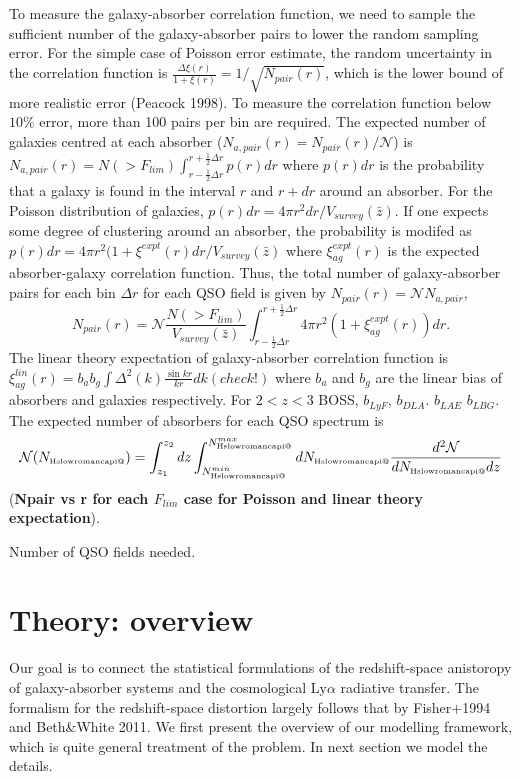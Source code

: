 \documentclass[useAMS,usenatbib,twocolumn]{mn2e}
\makeatletter
\newcommand{\Rmnum}[1]{\expandafter\@slowromancap\romannumeral #1@}
\newcommand{\LyA}{\mbox{Ly}\alpha}
\newcommand{\NHI}{N_{\mbox{\tiny H\Rmnum{1}}}}
\makeatother
\begin{document}
To measure the galaxy-absorber correlation function, we need to sample
the sufficient number of the galaxy-absorber pairs to lower the random
sampling error. For the simple case of Poisson error estimate, the random 
uncertainty in the correlation function is $\frac{\Delta \xi(r)}{1+\xi(r)}
=1/\sqrt{N_{pair}(r)}$, which is the lower bound of more realistic error 
(Peacock 1998). To measure the correlation function below $10\%$ error,
more than 100 pairs per bin are required. The expected number of galaxies 
centred at 
each absorber ($N_{a,pair}(r)=N_{pair}(r)/\mathcal{N}$) is $N_{a,pair}(r)=N(>F_{lim})
\int_{r-\frac{1}{2}\Delta r}^{r+\frac{1}{2}\Delta r}p(r)dr$ where $p(r)dr$ is the 
probability that a galaxy is found in the interval $r$ and $r+dr$ around an 
absorber. For the Poisson distribution of galaxies, 
$p(r)dr=4\pi r^2dr/V_{survey}(\bar{z})$. If one expects some degree of clustering
around an absorber, the probability is modifed as 
$p(r)dr=4\pi r^2(1+\xi^{expt}(r) dr/V_{survey}(\bar{z})$ where $\xi^{expt}_{ag}(r)$ 
is the expected absorber-galaxy correlation function.
Thus, the total number of galaxy-absorber pairs for each bin $\Delta r$ for
each QSO field is given by $N_{pair}(r)=\mathcal{N}N_{a,pair}$,
\begin{equation}
N_{pair}(r)=\mathcal{N}\frac{N(>F_{lim})}{V_{survey}(\bar{z})}
\int_{r-\frac{1}{2}\Delta r}^{r+\frac{1}{2}\Delta r}
4\pi r^2\left(1+\xi^{expt}_{ag}(r)\right)dr.
\end{equation}
The linear theory expectation of galaxy-absorber correlation function is 
$\xi_{ag}^{lin}(r)=b_ab_g\int \Delta^2(k)\frac{\sin kr}{kr}dk (check!)$
where $b_a$ and $b_g$ are the linear bias of absorbers and galaxies 
respectively. For $2<z<3$ BOSS, $b_{LyF}$, $b_{DLA}$. $b_{LAE}$ $b_{LBG}$. 
The expected number of absorbers for each QSO spectrum is
\begin{equation}
\mathcal{N}(\NHI)=\int_{z_1}^{z_2}dz\int_{\NHI^{min}}^{\NHI^{max}}d\NHI 
\frac{d^2\mathcal{N}}{d\NHI dz}
\end{equation}
(\textbf{Npair vs r for each $F_{lim}$ case for Poisson and linear theory
expectation}).



Number of QSO fields needed.

\section{Theory: overview}
Our goal is to connect the statistical formulations of the redshift-space 
anistoropy of galaxy-absorber systems and the cosmological $\LyA$ radiative 
transfer. The formalism for the redshift-space distortion largely follows
that by Fisher+1994 and Beth\&White 2011. We first present the overview of
our modelling framework, which is quite general treatment of the problem.
In next section we model the details.
\end{document}
